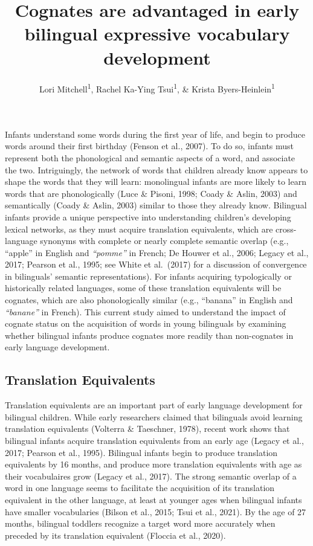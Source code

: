 \documentclass[
  english,
  ,man,floatsintext]{apa6}
\title{Cognates are advantaged in early bilingual expressive vocabulary development}
\author{Lori Mitchell\textsuperscript{1}, Rachel Ka-Ying Tsui\textsuperscript{1}, \& Krista Byers-Heinlein\textsuperscript{1}}
\date{}
\affiliation{\vspace{0.5cm}\textsuperscript{1} Concordia University}
\begin{document}
\maketitle

\captionsetup[table]{labelformat=empty}

Infants understand some words during the first year of life, and begin to produce words around their first birthday (Fenson et al., 2007). To do so, infants must represent both the phonological and semantic aspects of a word, and associate the two. Intriguingly, the network of words that children already know appears to shape the words that they will learn: monolingual infants are more likely to learn words that are phonologically (Luce \& Pisoni, 1998; Coady \& Aslin, 2003) and semantically (Coady \& Aslin, 2003) similar to those they already know. Bilingual infants provide a unique perspective into understanding children's developing lexical networks, as they must acquire translation equivalents, which are cross-language synonyms with complete or nearly complete semantic overlap (e.g., ``apple'' in English and \emph{``pomme''} in French; De Houwer et al., 2006; Legacy et al., 2017; Pearson et al., 1995; see White et al.~(2017) for a discussion of convergence in bilinguals' semantic representations). For infants acquiring typologically or historically related languages, some of these translation equivalents will be cognates, which are also phonologically similar (e.g., ``banana''  in English and \emph{``banane''}  in French). This current study aimed to understand the impact of cognate status on the acquisition of words in young bilinguals by examining whether bilingual infants produce cognates more readily than non-cognates in early language development.

\hypertarget{translation-equivalents}{%
\subsection{Translation Equivalents}\label{translation-equivalents}}

Translation equivalents are an important part of early language development for bilingual children. While early researchers claimed that bilinguals avoid learning translation equivalents (Volterra \& Taeschner, 1978), recent work shows that bilingual infants acquire translation equivalents from an early age (Legacy et al., 2017; Pearson et al., 1995). Bilingual infants begin to produce translation equivalents by 16 months, and produce more translation equivalents with age as their vocabulaires grow (Legacy et al., 2017). The strong semantic overlap of a word in one language seems to facilitate the acquisition of its translation equivalent in the other language, at least at younger ages when bilingual infants have smaller vocabularies (Bilson et al., 2015; Tsui et al., 2021). By the age of 27 months, bilingual toddlers recognize a target word more accurately when preceded by its translation equivalent (Floccia et al., 2020).
\end{document}
